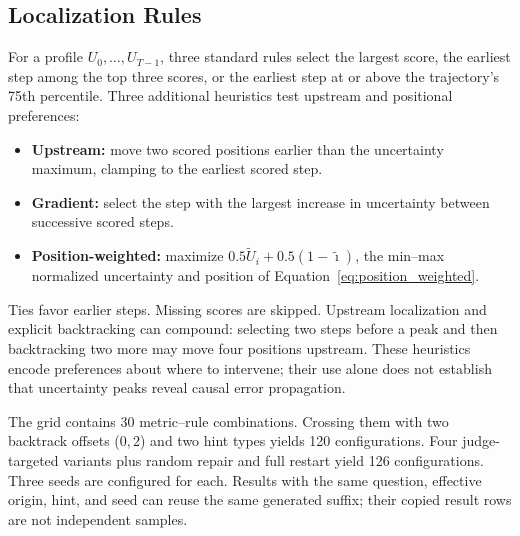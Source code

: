 \documentclass{article}
\begin{document}
\subsection{Localization Rules}
For a profile $U_0,\ldots,U_{T-1}$, three standard rules select the largest
score, the earliest step among the top three scores, or the earliest step
at or above the trajectory's 75th percentile. Three additional heuristics
test upstream and positional preferences:
\begin{itemize}
\item \textbf{Upstream:} move two scored positions earlier than the
      uncertainty maximum, clamping to the earliest scored step.
\item \textbf{Gradient:} select the step with the largest increase in
      uncertainty between successive scored steps.
\item \textbf{Position-weighted:} maximize
      $0.5\widetilde U_i+0.5(1-\widetilde\imath)$, the min--max normalized
      uncertainty and position of Equation~\ref{eq:position_weighted}.
\end{itemize}
Ties favor earlier steps. Missing scores are skipped. Upstream localization
and explicit backtracking can compound: selecting two steps before a peak
and then backtracking two more may move four positions upstream. These
heuristics encode preferences about where to intervene; their use alone
does not establish that uncertainty peaks reveal causal error propagation.


The grid contains 30 metric--rule combinations. Crossing them with two
backtrack offsets ($0,2$) and two hint types yields 120 configurations.
Four judge-targeted variants plus random repair and full restart yield
126 configurations. Three seeds are configured for each. Results with
the same question, effective origin, hint, and seed can reuse the same
generated suffix; their copied result rows are not independent samples.
\end{document}
